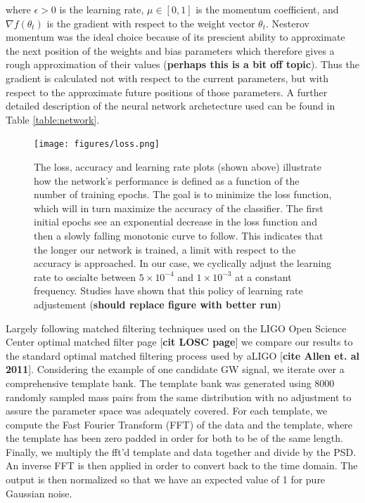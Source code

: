 \documentclass[%
 amsmath,amssymb,
 aps,
 twocolumn,
floatfix,
]{revtex4-1}
\begin{document}
where $\epsilon > 0$ is the learning rate, $\mu \in [0,1]$ is the momentum coefficient, and $\nabla f(\theta_{t})$ is the gradient with respect to the weight vector $\theta_{t}$. Nesterov momentum was the ideal choice because of its prescient ability to approximate the next position of the weights and bias parameters which therefore gives a rough approximation of their values (\textbf{perhaps this is a bit off topic}). Thus the gradient is calculated not with respect to the current parameters, but with respect to the approximate future positions of those parameters. A further detailed description of the neural network archetecture used can be found in Table \ref{table:network}.

\begin{figure}[!h]
 \texttt{[image: figures/loss.png]}
 \caption{\label{fig:loss_curve} The loss, accuracy and learning rate plots (shown above) illustrate how the network's performance is defined as a function of the number of training epochs. The goal is to minimize the loss function, which will in turn maximize the accuracy of the classifier. The first initial epochs see an exponential decrease in the loss function and then a slowly falling monotonic curve to follow. This indicates that the longer our network is trained, a limit with respect to the accuracy is approached. In our case, we cyclically adjust the learning rate to oscialte between $5 \times 10^{-4}$ and $1 \times 10^{-3}$ at a constant frequency. Studies have shown that this policy of learning rate adjustement (\textbf{should replace figure with better run})
}
\end{figure}

Largely following matched filtering techniques used on the LIGO Open Science Center optimal matched filter page [\textbf{cit LOSC page}] we compare our results to the standard optimal matched filtering process used by aLIGO [\textbf{cite Allen et. al 2011}]. Considering the example of one candidate GW signal, we iterate over a comprehensive template bank. The template bank was generated using 8000 randomly sampled mass pairs from the same distribution with no adjustment to assure the parameter space was adequately covered. For each template, we compute the Fast Fourier Transform (FFT) of the data and the template, where the template has been zero padded in order for both to be of the same length. Finally, we multiply the fft'd template and data together and divide by the PSD. An inverse FFT is then applied in order to convert back to the time domain. The output is then normalized so that we have an expected value of 1 for pure Gaussian noise.
\end{document}
